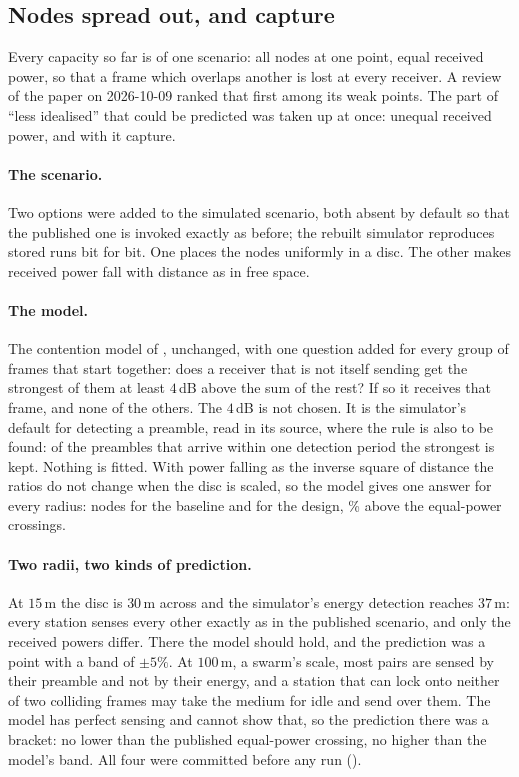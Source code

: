 \subsection{Nodes spread out, and capture}\label{sec:spread}

Every capacity so far is of one scenario: all nodes at one point, equal received power, so that
a frame which overlaps another is lost at every receiver. A review of the paper on 2026-10-09
ranked that first among its weak points. The part of ``less idealised'' that could be predicted
was taken up at once: unequal received power, and with it capture.

\paragraph{The scenario.} Two options were added to the simulated scenario, both absent by
default so that the published one is invoked exactly as before; the rebuilt simulator
reproduces stored runs bit for bit. One places the nodes uniformly in a disc. The other makes
received power fall with distance as in free space.

\paragraph{The model.} The contention model of , unchanged, with one question
added for every group of frames that start together: does a receiver that is not itself sending
get the strongest of them at least $4$\,dB above the sum of the rest? If so it receives that
frame, and none of the others. The $4$\,dB is not chosen. It is the simulator's default for
detecting a preamble, read in its source, where the rule is also to be found: of the preambles
that arrive within one detection period the strongest is kept. Nothing is fitted. With power
falling as the inverse square of distance the ratios do not change when the disc is scaled, so
the model gives one answer for every radius: \sprModelBase{} nodes for the baseline and
\sprModelDesign{} for the design, \sprGainLo\% above the equal-power crossings.

\paragraph{Two radii, two kinds of prediction.} At $15$\,m the disc is $30$\,m across and the
simulator's energy detection reaches $37$\,m: every station senses every other exactly as in
the published scenario, and only the received powers differ. There the model should hold, and
the prediction was a point with a band of $\pm 5\%$. At $100$\,m, a swarm's scale, most pairs
are sensed by their preamble and not by their energy, and a station that can lock onto neither
of two colliding frames may take the medium for idle and send over them. The model has perfect
sensing and cannot show that, so the prediction there was a bracket: no lower than the
published equal-power crossing, no higher than the model's band. All four were committed before
any run ().

